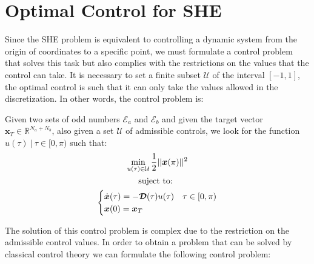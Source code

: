
\section{Optimal Control for SHE}

Since the SHE problem is equivalent to controlling a dynamic system from the origin of coordinates to a specific point, we must formulate a control problem that solves this task but also complies with the restrictions on the values that the control can take. It is necessary to set a finite subset $ \mathcal {U} $ of the interval $ [- 1,1] $, the optimal control is such that it can only take the values allowed in the discretization. In other words, the control problem is:
\begin{problem}\label{OCP1}
    Given two sets of odd numbers $ \mathcal {E} _a $ and $ \mathcal {E} _b $ and given the target vector $ \bm {x} _T \in \mathbb {R} ^ {N_a + N_b} $, also given a set $ \mathcal {U} $ of admissible controls, we look for the function $ u (\tau) \ | \ \tau \in [0, \pi) $ such that:
    \begin{gather}
        \min_{u(\tau) \in \mathcal{U}}         
         \frac{1}{2}|| \bm{x}(\pi)  ||^2   \\
        \notag \text{suject to: } \\
        \begin{cases}
            \dot{\bm{x}}(\tau) = -\bm{\mathcal{D}}(\tau) u(\tau)  & \tau \in [0,\pi)\\
            \bm{x}(0) = \bm{x}_T
        \end{cases}
    \end{gather}
\end{problem}
%
The solution of this control problem is complex due to the restriction on the admissible control values.
%
In order to obtain a problem that can be solved by classical control theory we can formulate the following control problem:

